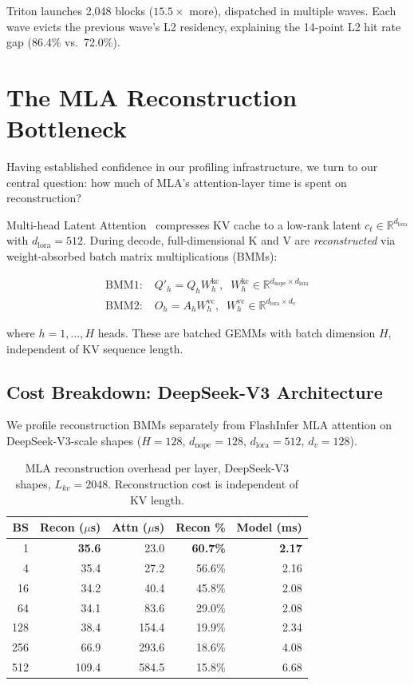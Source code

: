 \documentclass[10pt,twocolumn]{article}
\begin{document}
Triton launches 2,048 blocks ($15.5\times$ more), dispatched in multiple waves.  Each wave evicts the previous wave's L2 residency, explaining the 14-point L2 hit rate gap (86.4\% vs.\ 72.0\%).

\section{The MLA Reconstruction Bottleneck}
\label{sec:recon}

Having established confidence in our profiling infrastructure, we turn to our central question: how much of MLA's attention-layer time is spent on reconstruction?

Multi-head Latent Attention~\cite{deepseekv2} compresses KV cache to a low-rank latent $c_t \in \mathbb{R}^{d_\text{lora}}$ with $d_\text{lora}=512$.  During decode, full-dimensional K and V are \emph{reconstructed} via weight-absorbed batch matrix multiplications (BMMs):

\begin{align}
\text{BMM1:} \; & Q'_h = Q_h W^\text{kc}_h, \;\; W^\text{kc}_h \!\in\! \mathbb{R}^{d_\text{nope} \times d_\text{lora}} \nonumber \\
\text{BMM2:} \; & O_h = A_h W^\text{vc}_h, \;\; W^\text{vc}_h \!\in\! \mathbb{R}^{d_\text{lora} \times d_v} \nonumber
\end{align}

where $h = 1, \ldots, H$ heads.  These are batched GEMMs with batch dimension $H$, independent of KV sequence length.

\subsection{Cost Breakdown: DeepSeek-V3 Architecture}

We profile reconstruction BMMs separately from FlashInfer MLA attention on DeepSeek-V3-scale shapes ($H=128$, $d_\text{nope}=128$, $d_\text{lora}=512$, $d_v=128$).

\begin{table}[h]
\centering
\small
\caption{MLA reconstruction overhead per layer, DeepSeek-V3 shapes, $L_{kv}=2048$.  Reconstruction cost is independent of KV length.}
\label{tab:recon}
\begin{tabular}{@{}rrrrr@{}}
\toprule
BS & Recon ($\mu$s) & Attn ($\mu$s) & Recon \% & Model (ms) \\
\midrule
  1 & \textbf{35.6} &  23.0 & \textbf{60.7\%} & \textbf{2.17} \\
  4 & 35.4 &  27.2 & 56.6\% & 2.16 \\
 16 & 34.2 &  40.4 & 45.8\% & 2.08 \\
 64 & 34.1 &  83.6 & 29.0\% & 2.08 \\
128 & 38.4 & 154.4 & 19.9\% & 2.34 \\
256 & 66.9 & 293.6 & 18.6\% & 4.08 \\
512 & 109.4 & 584.5 & 15.8\% & 6.68 \\
\bottomrule
\end{tabular}
\end{table}
\end{document}

